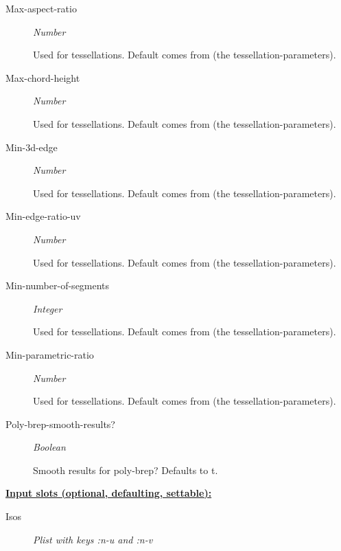 \documentclass [11pt]{book}
\begin{document}
\begin{itemize}
\begin{description}
\item [Max-aspect-ratio]
\emph{Number}

 Used for tessellations. Default comes from (the tessellation-parameters).




\item [Max-chord-height]
\emph{Number}

 Used for tessellations. Default comes from (the tessellation-parameters).




\item [Min-3d-edge]
\emph{Number}

 Used for tessellations. Default comes from (the tessellation-parameters).




\item [Min-edge-ratio-uv]
\emph{Number}

 Used for tessellations. Default comes from (the tessellation-parameters).




\item [Min-number-of-segments]
\emph{Integer}

 Used for tessellations. Default comes from (the tessellation-parameters).




\item [Min-parametric-ratio]
\emph{Number}

 Used for tessellations. Default comes from (the tessellation-parameters).




\item [Poly-brep-smooth-results?]
\emph{Boolean}

 Smooth results for poly-brep? Defaults to t.




\end{description}






\textbf{
\underline{Input slots (optional, defaulting, settable):}}

\begin{description}

\item [Isos]
\emph{Plist with keys :n-u and :n-v}


\end{description}
\end{itemize}
\end{document}
